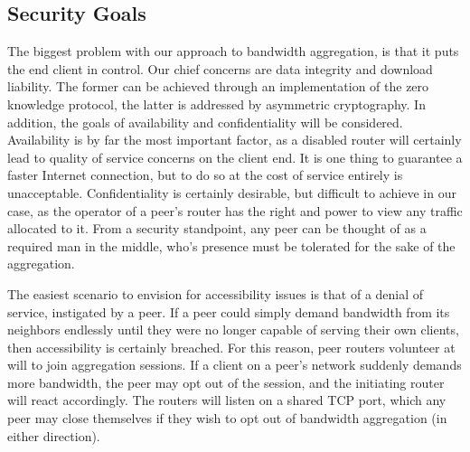 \documentclass[12pt]{article}
\begin{document}
	\subsection{Security Goals}

		The biggest problem with our approach to bandwidth aggregation, is that it puts the end client in control. Our chief concerns are data integrity and download liability. The former can be achieved through an implementation of the zero knowledge protocol, the latter is addressed by asymmetric cryptography. In addition, the goals of availability and confidentiality will be considered. Availability is by far the most important factor, as a disabled router will certainly lead to quality of service concerns on the client end. It is one thing to guarantee a faster Internet connection, but to do so at the cost of service entirely is unacceptable. Confidentiality is certainly desirable, but difficult to achieve in our case, as the operator of a peer's router has the right and power to view any traffic allocated to it. From a security standpoint, any peer can be thought of as a required man in the middle, who's presence must be tolerated for the sake of the aggregation. 

		The easiest scenario to envision for accessibility issues is that of a denial of service, instigated by a peer. If a peer could simply demand bandwidth from its neighbors endlessly until they were no longer capable of serving their own clients, then accessibility is certainly breached. For this reason, peer routers volunteer at will to join aggregation sessions. If a client on a peer's network suddenly demands more bandwidth, the peer may opt out of the session, and the initiating router will react accordingly. The routers will listen on a shared TCP port, which any peer may close themselves if they wish to opt out of bandwidth aggregation (in either direction).
\end{document}
